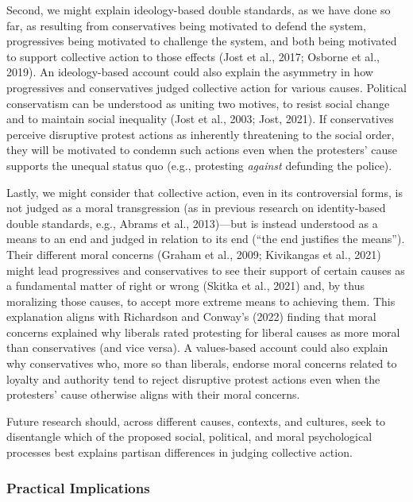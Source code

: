 \documentclass[12pt, letterpaper]{article}
\begin{document}
Second, we might explain ideology-based double standards, as we have
done so far, as resulting from conservatives being motivated to defend
the system, progressives being motivated to challenge the system, and
both being motivated to support collective action to those effects (Jost
et al., 2017; Osborne et al., 2019). An ideology-based account could
also explain the asymmetry in how progressives and conservatives judged
collective action for various causes. Political conservatism can be
understood as uniting two motives, to resist social change and to
maintain social inequality (Jost et al., 2003; Jost, 2021). If
conservatives perceive disruptive protest actions as inherently
threatening to the social order, they will be motivated to condemn such
actions even when the protesters' cause supports the unequal status quo
(e.g., protesting \emph{against} defunding the police).

Lastly, we might consider that collective action, even in its
controversial forms, is not judged as a moral transgression (as in
previous research on identity-based double standards, e.g., Abrams et
al., 2013)---but is instead understood as a means to an end and judged
in relation to its end (``the end justifies the means''). Their
different moral concerns (Graham et al., 2009; Kivikangas et al., 2021)
might lead progressives and conservatives to see their support of
certain causes as a fundamental matter of right or wrong (Skitka et al.,
2021) and, by thus moralizing those causes, to accept more extreme means
to achieving them. This explanation aligns with Richardson and Conway's
(2022) finding that moral concerns explained why liberals rated
protesting for liberal causes as more moral than conservatives (and vice
versa). A values-based account could also explain why conservatives who,
more so than liberals, endorse moral concerns related to loyalty and
authority tend to reject disruptive protest actions even when the
protesters' cause otherwise aligns with their moral concerns.

Future research should, across different causes, contexts, and cultures,
seek to disentangle which of the proposed social, political, and moral
psychological processes best explains partisan differences in judging
collective action.

\hypertarget{practical-implications}{%
\subsubsection{Practical Implications}\label{practical-implications}}
\end{document}

